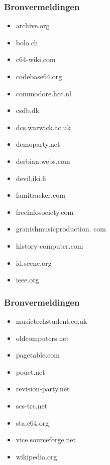 
\begin{frame}[noframenumbering]
\frametitle{Bronvermeldingen}

\begin{multicols}{2}
\begin{itemize}
\item archive.org
\item bolo.ch
\item c64-wiki.com
\item codebase64.org
\item commodore.hcc.nl
\item csdb.dk
\item dcs.warwick.ac.uk
\item demoparty.net
\item derbian.webs.com
\item devil.iki.fi
\item famitracker.com
\item freeinfosociety.com
\item granishmusicproduction. com
\item history-computer.com
\item id.scene.org
\item ieee.org
\end{itemize}
\end{multicols}

\end{frame}


\begin{frame}[noframenumbering]
\frametitle{Bronvermeldingen}

\begin{multicols}{2}
\begin{itemize}
\item musictechstudent.co.uk
\item oldcomputers.net
\item pagetable.com
\item pouet.net
\item revision-party.net
\item scs-trc.net
\item sta.c64.org
\item vice.sourceforge.net
\item wikipedia.org
\end{itemize}
\end{multicols}

\end{frame}

